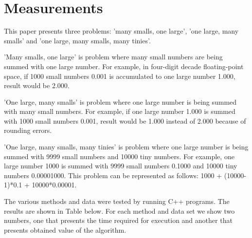 \documentclass[conference]{IEEEtran}
\begin{document}
\section{Measurements}
This paper presents three problems: 'many smalls, one large',
'one large, many smalls' and 'one large, many smalls, many tinies'.
\par
'Many smalls, one large' is problem where many small numbers 
are being summed with one large number. For example, 
in four-digit decade floating-point space, if 1000 small 
numbers 0.001 is accumulated to one large 
number 1.000, result would be 2.000. 
\par 
'One large, many smalls' is problem where one large number 
is being summed with many small numbers. For example, 
if one large number 1.000 is summed with 1000 small 
numbers 0.001, result would be 1.000 instead of 2.000 
because of rounding errors.
\par 
'One large, many smalls, many tinies' is problem where one 
large number is being summed with 9999 small numbers and
10000 tiny numbers. For example, one large number 1000 is 
summed with 9999 small numbers 0.1000 and 10000 tiny 
numbers 0.00001000. This problem can be represented 
as follows: 1000 + (10000-1)*0.1 + 10000*0.00001.
\par
The various methods and data were tested by running C++ programs.
The results are shown in Table below. For each method and data 
set we show two numbers, one that presents the time required for 
execution and another that presents obtained value of the algorithm.
\end{document}

